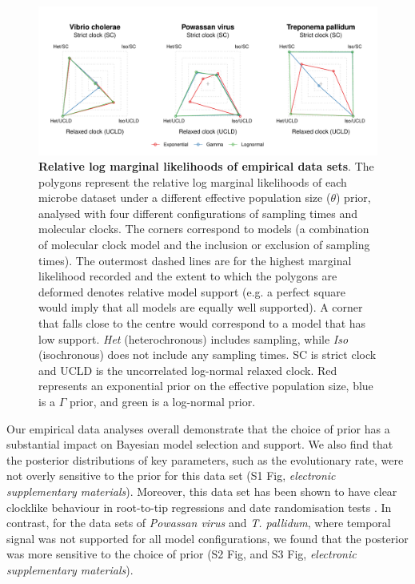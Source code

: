 \documentclass[10pt,letterpaper]{article}
\begin{document}
\begin{figure}
	\begin{center}
		\includegraphics[width=14cm]{figure_1.pdf}\newline		
		\vspace{-0.5cm}
		\caption{\textbf{Relative log marginal likelihoods of empirical data sets}. {The polygons represent the relative log marginal likelihoods of each microbe dataset under a different effective population size ($\theta$) prior, analysed with four different configurations of sampling times and molecular clocks. The corners correspond to models (a combination of molecular clock model and the inclusion or exclusion of sampling times). The outermost dashed lines are for the highest marginal likelihood recorded and the extent to which the polygons are deformed denotes relative model support (e.g. a perfect square would imply that all models are equally well supported). A corner that falls close to the centre would correspond to a model that has low support.} \textit{Het} (heterochronous) includes sampling, while \textit{Iso} (isochronous) does not include any sampling times. SC is strict clock and UCLD is the uncorrelated log-normal relaxed clock. Red represents an exponential prior on the effective population size, blue is a $\Gamma$ prior, and green is a log-normal prior.}
		\label{figure:polygon_plots}
	\end{center}
\end{figure}

Our empirical data analyses overall demonstrate that the choice of prior has a substantial impact on Bayesian model selection and support. We also find that the posterior distributions of key parameters, such as the evolutionary rate, were not overly sensitive to the prior for this data set (S1 Fig, \textit{electronic supplementary materials}). Moreover, this data set has been shown to have clear clocklike behaviour in root-to-tip regressions and date randomisation tests \cite{duchene2016genome}. In contrast, for the data sets of \textit{Powassan virus} and \textit{T. pallidum}, where temporal signal was not supported for all model configurations, we found that the posterior was more sensitive to the choice of prior (S2 Fig, and S3 Fig, \textit{electronic supplementary materials}).
\end{document}
